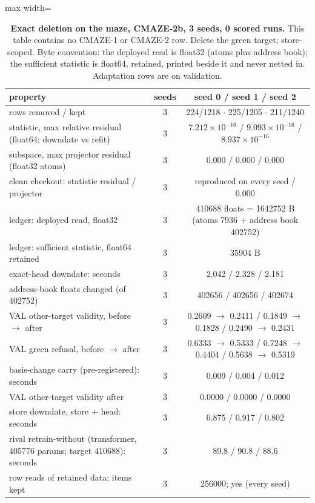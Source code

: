 \documentclass{article} %
\newcommand{\sci}[2]{\ensuremath{#1\times10^{#2}}}
\begin{document}
\begin{table}[h]
\centering\small
\caption{\textbf{Exact deletion on the maze, CMAZE-2b, 3 seeds, 0 scored runs.} This table %
contains no CMAZE-1 or CMAZE-2 row. Delete the green target; store-scoped. Byte convention: the
deployed read is float32 (atoms plus address book); the sufficient statistic is float64, retained,
printed beside it and never netted in. Adaptation rows are on validation.}
\label{tab:maze-del-2b}
\begin{adjustbox}{max width=\linewidth}\begin{tabular}{lcc}
\toprule
property & seeds & seed 0 / seed 1 / seed 2 \\
\midrule
rows removed / kept & 3 & 224/1218 $\cdot$ 225/1205 $\cdot$ 211/1240 \\
statistic, max relative residual (float64; downdate vs refit) & 3 & \sci{7.212}{-16} / \sci{9.093}{-16} / \sci{8.937}{-16} \\
subspace, max projector residual (float32 atoms) & 3 & 0.000 / 0.000 / 0.000 \\
clean checkout: statistic residual / projector & 3 & reproduced on every seed / 0.000 \\
ledger: deployed read, float32 & 3 & 410688 floats = 1642752 B (atoms 7936 + address book 402752) \\
ledger: sufficient statistic, float64 retained & 3 & 35904 B \\
exact-head downdate: seconds & 3 & 2.042 / 2.328 / 2.181 \\
\quad address-book floats changed (of 402752) & 3 & 402656 / 402656 / 402674 \\
\quad VAL other-target validity, before $\to$ after & 3 & 0.2609 $\to$ 0.2411 / 0.1849 $\to$ 0.1828 / 0.2490 $\to$ 0.2431 \\
\quad VAL green refusal, before $\to$ after & 3 & 0.6333 $\to$ 0.5333 / 0.7248 $\to$ 0.4404 / 0.5638 $\to$ 0.5319 \\
basis-change carry (pre-registered): seconds & 3 & 0.009 / 0.004 / 0.012 \\
\quad VAL other-target validity after & 3 & 0.0000 / 0.0000 / 0.0000 \\
store downdate, store + head: seconds & 3 & 0.875 / 0.917 / 0.802 \\
rival retrain-without (transformer, 405776 params; target 410688): seconds & 3 & 89.8 / 90.8 / 88.6 \\
\quad row reads of retained data; items kept & 3 & 256000; yes (every seed) \\
\bottomrule
\end{tabular}\end{adjustbox}
\end{table}
\end{document}
